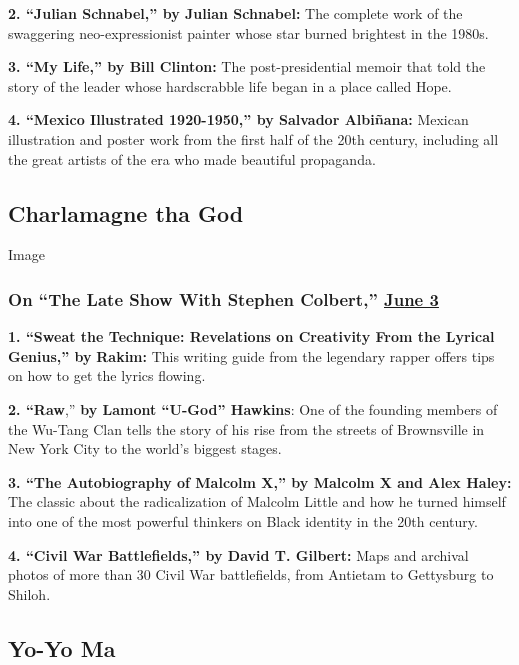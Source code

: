 \textbf{2. ``Julian Schnabel,'' by Julian Schnabel:} The complete work
of the swaggering neo-expressionist painter whose star burned brightest
in the 1980s.

\textbf{3. ``My Life,'' by Bill Clinton:} The post-presidential memoir
that told the story of the leader whose hardscrabble life began in a
place called Hope.

\textbf{4. ``Mexico Illustrated 1920-1950,'' by Salvador Albiñana:}
Mexican illustration and poster work from the first half of the 20th
century, including all the great artists of the era who made beautiful
propaganda.

\hypertarget{charlamagne-tha-god}{%
\subsection{Charlamagne tha God}\label{charlamagne-tha-god}}

Image

\hypertarget{on-the-late-show-with-stephen-colbert-june-3}{%
\subsubsection{\texorpdfstring{On ``The Late Show With Stephen
Colbert,'' \href{https://www.youtube.com/watch?v=cKUgF5EcZPI}{June
3}}{On ``The Late Show With Stephen Colbert,'' June 3}}\label{on-the-late-show-with-stephen-colbert-june-3}}

\textbf{1. ``Sweat the Technique: Revelations on Creativity From the
Lyrical Genius,'' by} \textbf{Rakim:} This writing guide from the
legendary rapper offers tips on how to get the lyrics flowing.

\textbf{2. ``Raw},'' \textbf{by Lamont ``U-God'' Hawkins}: One of the
founding members of the Wu-Tang Clan tells the story of his rise from
the streets of Brownsville in New York City to the world's biggest
stages.

\textbf{3. ``The Autobiography of Malcolm X,'' by Malcolm X and Alex
Haley:} The classic about the radicalization of Malcolm Little and how
he turned himself into one of the most powerful thinkers on Black
identity in the 20th century.

\textbf{4. ``Civil War Battlefields,'' by David T. Gilbert:} Maps and
archival photos of more than 30 Civil War battlefields, from Antietam to
Gettysburg to Shiloh.

\hypertarget{yo-yo-ma}{%
\subsection{Yo-Yo Ma}\label{yo-yo-ma}}


